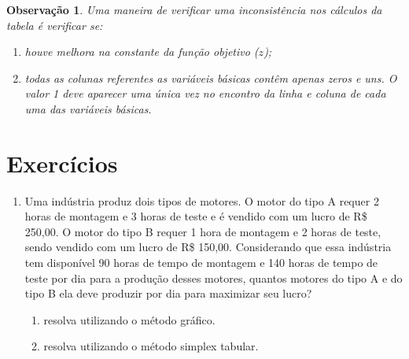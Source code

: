 \documentclass[
	12pt,				%
	openright,			%
	twoside,			%
	a4paper,			%
	english,			%
	french,				%
	brazil,				%
	sumario=tradicional
]{abntex2}
\newtheorem{remark}{Observação}
\numberwithin{example}{chapter}
\numberwithin{remark}{chapter}
\numberwithin{definition}{chapter}
\numberwithin{figure}{chapter}
\begin{document}
\begin{remark}
    Uma maneira de verificar uma inconsistência nos cálculos da tabela é verificar se:
    \begin{enumerate}
        \item houve melhora na constante da função objetivo ($z$);
        \item todas as colunas referentes as variáveis básicas contêm apenas zeros e uns. O valor 1 deve aparecer uma única vez no encontro da linha e coluna de cada uma das variáveis básicas.
    \end{enumerate}
\end{remark}

\section{Exercícios}

\begin{enumerate}
	\item Uma indústria produz dois tipos de motores. O motor do tipo A requer 2 horas de montagem e 3 horas de teste e é vendido com um lucro de R\$ 250,00. O motor do tipo B requer 1 hora de montagem e 2 horas de teste, sendo vendido com um lucro de R\$ 150,00. Considerando que essa indústria tem disponível 90 horas de tempo de montagem e 140 horas de tempo de teste por dia para a produção desses motores, quantos motores do tipo A e do tipo B ela deve produzir por dia para maximizar seu lucro?
	\begin{enumerate}
	    \item resolva utilizando o método gráfico.
	
	    \item resolva utilizando o método simplex tabular.
	\end{enumerate}
\end{enumerate}

%	
%	
%	
\end{document}
